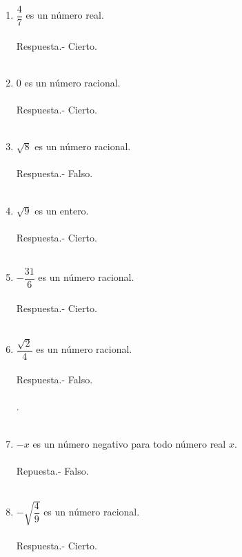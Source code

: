\begin{enumerate}
\begin{enumerate}[\bfseries (a)]
\item $\dfrac{4}{7}$ es un número real.\\\\
Respuesta.- \; Cierto.\\\\

\item $0$ es un número racional.\\\\
Respuesta.- \; Cierto.\\\\

\item $\sqrt{8}$ es un número racional.\\\\
Respuesta.- \; Falso.\\\\

\item $\sqrt{9}$ es un entero.\\\\
Respuesta.- \; Cierto. \\\\

\item $- \dfrac{31}{6}$ es un número racional.\\\\
Respuesta.- \; Cierto. \\\\

\item $\dfrac{\sqrt{2}}{4}$ es un número racional.\\\\
Respuesta.- \; Falso.\\\\.\\\\

\item $-x$ es un número negativo para todo número real $x$. \\\\
Repuesta.- \; Falso.\\\\

\item $- \sqrt{\dfrac{4}{9}}$ es un número racional.\\\\
Respuesta.- \; Cierto.\\\\


\end{enumerate}
\end{enumerate}
